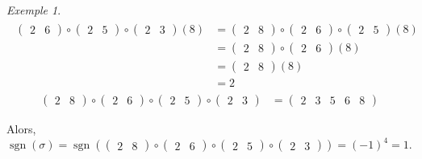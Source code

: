 \documentclass{report}
\newcommand*{\signe}{\operatorname{sgn}}
\theoremstyle{definition}
\theoremstyle{remark}
\newtheorem*{exem}{Exemple}
\begin{document}
\begin{exem}
\begin{align*}
\begin{split}
\begin{pmatrix}
					2&6
				\end{pmatrix} \circ \begin{pmatrix}
					2&5
				\end{pmatrix} \circ \begin{pmatrix}
					2&3
				\end{pmatrix}(8)&= \begin{pmatrix}
					2&8
				\end{pmatrix} \circ \begin{pmatrix}
					2&6
				\end{pmatrix} \circ \begin{pmatrix}
					2&5
				\end{pmatrix}(8)\\
				&= \begin{pmatrix}
					2&8
				\end{pmatrix} \circ \begin{pmatrix}
					2&6
				\end{pmatrix}(8)\\
				&= \begin{pmatrix}
					2&8
				\end{pmatrix}(8)\\
				&= 2
			\end{split}\tag{8}
		\end{align*}
		\begin{align*}
		\begin{pmatrix}
			2&8
		\end{pmatrix} \circ \begin{pmatrix}
			2&6
		\end{pmatrix} \circ \begin{pmatrix}
			2&5
		\end{pmatrix} \circ \begin{pmatrix}
			2&3
		\end{pmatrix}&= \begin{pmatrix}
			2&3&5&6&8
		\end{pmatrix}
		\end{align*}

		Alors, $\signe(\sigma) = \signe\left( \begin{pmatrix}
			2&8
		\end{pmatrix} \circ \begin{pmatrix}
			2&6
		\end{pmatrix} \circ \begin{pmatrix}
			2&5
		\end{pmatrix} \circ \begin{pmatrix}
			2&3
		\end{pmatrix} \right) = (-1)^4 = 1$.
	\end{exem}
\end{document}
